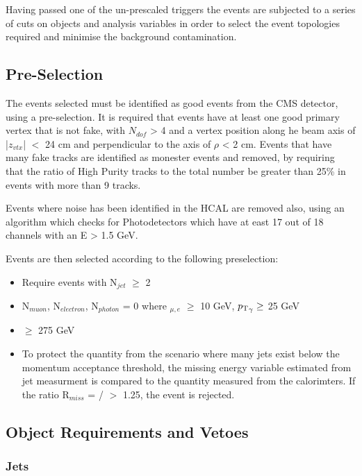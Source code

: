 Having passed one of the un-prescaled triggers the events are subjected to a series of cuts on objects and analysis variables in order to select the event topologies required and minimise the background contamination. 

\subsection{Pre-Selection}

The events selected must be identified as good events from the CMS detector, using a pre-selection. It is required that events have at least one good primary vertex that is not fake, with $N_{dof}$ > 4 and a vertex position along he beam axis of |$z_{vtx}$| $<$ 24 cm and perpendicular to the axis of $\rho$ < 2 cm. Events that have many fake tracks are identified as monester events and removed, by requiring that the ratio of High Purity tracks to the total number be greater than 25\% in events with more than 9 tracks. 

Events where noise has been identified in the HCAL are removed also, using an algorithm which checks for Photodetectors which have at east 17 out of 18 channels with an E > 1.5 GeV.

Events are then selected according to the following preselection:

\begin{itemize}
\item{Require events with N$_{jet}$ $\geq$ 2}
\item{N$_{muon}$, N$_{electron}$, N$_{photon}$ = 0 where \Pt$_{\mu,e}$ $\geq$ 10 GeV, ${p_{\text T}}_{\gamma} \geq$ 25 GeV}
\item{\HT $\geq$ 275 GeV }

\item{To protect the quantity \alt from the scenario where many jets exist below the momentum acceptance threshold, the missing energy variable \mht estimated from jet measurment is compared to the quantity \met measured from the calorimters. If the ratio R$_{miss}$ = \mht / \met $>$ 1.25, the event is rejected. 
}
\end{itemize}

\subsection {Object Requirements and Vetoes}
\subsubsection{Jets}

